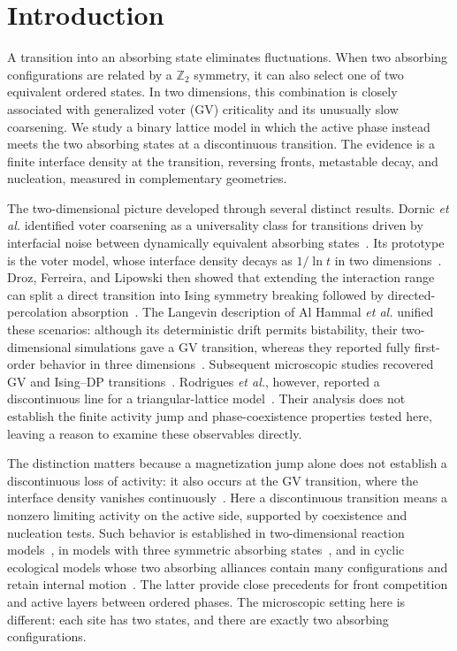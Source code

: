 \section{Introduction}
\label{sec:intro}

A transition into an absorbing state eliminates fluctuations. When two absorbing
configurations are related by a $\mathbb{Z}_2$ symmetry, it can also select one of two
equivalent ordered states. In two dimensions, this combination is closely associated with
generalized voter (GV) criticality and its unusually slow coarsening. We study a binary
lattice model in which the active phase instead meets the two absorbing states at a
discontinuous transition. The evidence is a finite interface density at the transition,
reversing fronts, metastable decay, and nucleation, measured in complementary geometries.

The two-dimensional picture developed through several distinct results. Dornic \emph{et al.}
identified voter coarsening as a universality class for transitions driven by interfacial
noise between dynamically equivalent absorbing states~\cite{dornic2001}. Its prototype is the
voter model, whose interface density decays as $1/\ln t$ in two
dimensions~\cite{clifford1973,holley1975,cox1986,krapivsky1992}. Droz, Ferreira, and Lipowski
then showed that extending the interaction range can split a direct transition into Ising
symmetry breaking followed by directed-percolation absorption~\cite{droz2003}. The Langevin
description of Al Hammal \emph{et al.} unified these scenarios: although its deterministic
drift permits bistability, their two-dimensional simulations gave a GV transition, whereas
they reported fully first-order behavior in three dimensions~\cite{alhammal2005}. Subsequent
microscopic studies recovered GV and Ising--DP transitions~\cite{vazquez2008,castellano2009,azizi2020}.
Rodrigues \emph{et al.}, however, reported a discontinuous line for a triangular-lattice
model~\cite{rodrigues2015}. Their analysis does not establish the finite activity jump and
phase-coexistence properties tested here, leaving a reason to examine these observables
directly.

The distinction matters because a magnetization jump alone does not establish a
discontinuous loss of activity: it also occurs at the GV transition, where the interface
density vanishes continuously~\cite{dornic2001,alhammal2005}. Here a discontinuous transition
means a nonzero limiting activity on the active side, supported by coexistence
and nucleation tests. Such behavior is established in two-dimensional reaction
models~\cite{ziff1986,bidaux1989,lubeck2006}, in models with three symmetric absorbing
states~\cite{lipowski2002,azizi2018}, and in cyclic ecological models whose two absorbing
alliances contain many configurations and retain internal motion~\cite{szabo2004,guisoni2013}.
The latter provide close precedents for front competition and active layers between ordered
phases. The microscopic setting here is different: each site has two states, and there are
exactly two absorbing configurations.

